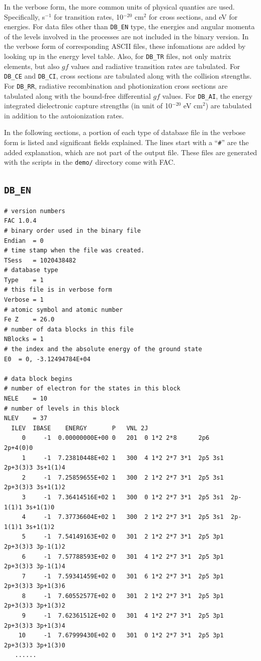 \documentclass[twoside,letterpaper]{refrep}
\begin{document}
In the verbose form, the more common units of physical quanties are
used. Specifically, s$^{-1}$ for transition rates, 10$^{-20}$ cm$^2$ for cross
sections, and eV for energies. For data files other than \texttt{DB\_EN} type,
the energies and angular momenta of the levels involved in the processes are
not included in the binary version. In the verbose form of corresponding ASCII
files, these infomations are added by looking up in the energy level
table. Also, for \texttt{DB\_TR} files, not only matrix elements, but also
$gf$ values and radiative transition rates are tabulated. For \texttt{DB\_CE}
and \texttt{DB\_CI}, cross
sections are tabulated along with the collision strengths. For \texttt{DB\_RR},
radiative recombination and photionization cross sections are tabulated along
with the bound-free differential $gf$ values. For \texttt{DB\_AI}, the energy
integrated dielectronic capture strengths (in unit of 10$^{-20}$ eV cm$^2$)
are tabulated in addition to the autoionization rates.

In the following sections, a portion of each type of database file in the
verbose form is listed and significant fields explained. The lines start with
a ``\verb|#|'' are the added explanation, which are not part of the output
file. These files are generated with the scripts in the \texttt{demo/}
directory come with FAC.

\subsection{\texttt{DB\_EN}}
\begin{verbatim}
# version numbers
FAC 1.0.4
# binary order used in the binary file
Endian	= 0
# time stamp when the file was created.
TSess	= 1020438482
# database type
Type	= 1
# this file is in verbose form
Verbose	= 1
# atomic symbol and atomic number
Fe Z	= 26.0
# number of data blocks in this file
NBlocks	= 1
# the index and the absolute energy of the ground state
E0	= 0, -3.12494784E+04

# data block begins
# number of electron for the states in this block
NELE	= 10
# number of levels in this block
NLEV	= 37
  ILEV  IBASE    ENERGY       P   VNL 2J
     0     -1  0.00000000E+00 0   201  0 1*2 2*8      2p6      2p+4(0)0 
     1     -1  7.23810448E+02 1   300  4 1*2 2*7 3*1  2p5 3s1  2p+3(3)3 3s+1(1)4 
     2     -1  7.25859655E+02 1   300  2 1*2 2*7 3*1  2p5 3s1  2p+3(3)3 3s+1(1)2 
     3     -1  7.36414516E+02 1   300  0 1*2 2*7 3*1  2p5 3s1  2p-1(1)1 3s+1(1)0 
     4     -1  7.37736604E+02 1   300  2 1*2 2*7 3*1  2p5 3s1  2p-1(1)1 3s+1(1)2 
     5     -1  7.54149163E+02 0   301  2 1*2 2*7 3*1  2p5 3p1  2p+3(3)3 3p-1(1)2 
     6     -1  7.57788593E+02 0   301  4 1*2 2*7 3*1  2p5 3p1  2p+3(3)3 3p-1(1)4 
     7     -1  7.59341459E+02 0   301  6 1*2 2*7 3*1  2p5 3p1  2p+3(3)3 3p+1(3)6 
     8     -1  7.60552577E+02 0   301  2 1*2 2*7 3*1  2p5 3p1  2p+3(3)3 3p+1(3)2 
     9     -1  7.62361512E+02 0   301  4 1*2 2*7 3*1  2p5 3p1  2p+3(3)3 3p+1(3)4 
    10     -1  7.67999430E+02 0   301  0 1*2 2*7 3*1  2p5 3p1  2p+3(3)3 3p+1(3)0 
   ......
\end{verbatim}
\end{document}
